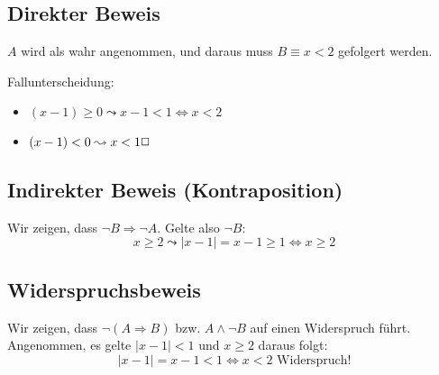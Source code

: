 \subsection{Direkter Beweis}
$A$ wird als wahr angenommen, und daraus muss $B\equiv x<2$ gefolgert werden.

Fallunterscheidung:
\begin{itemize}
  \item $(x-1)\geq0\leadsto x-1<1 \Leftrightarrow x<2$
  \item $(x-1)<0\leadsto x<1 \hfill\Box$
\end{itemize}
\subsection{Indirekter Beweis (Kontraposition)}
Wir zeigen, dass $\neg B\Rightarrow \neg A$.
Gelte also $\neg B$:
\begin{equation*}
  x\geq2 \leadsto |x-1|=x-1\geq 1 \Leftrightarrow x\geq 2
\end{equation*}
\subsection{Widerspruchsbeweis}
Wir zeigen, dass $\neg(A\Rightarrow B)$ bzw. $A\wedge \neg B$ auf einen Widerspruch führt.
Angenommen, es gelte $|x-1|<1$ und $x\geq 2$ daraus folgt:
\begin{equation*}
  |x-1|=x-1<1\Leftrightarrow x<2 \text{ Widerspruch!}
\end{equation*}
